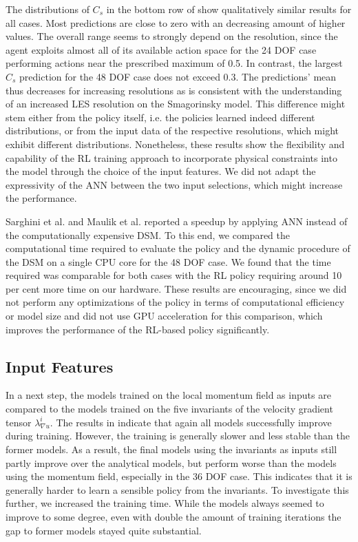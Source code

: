 The distributions of $C_s$ in the bottom row of  show qualitatively similar results for all cases.
Most predictions are close to zero with an decreasing amount of higher values.
The overall range seems to strongly depend on the resolution, since the agent exploits almost all of its available action space for the 24 DOF case performing actions near the prescribed maximum of 0.5.
In contrast, the largest $C_s$ prediction for the 48 DOF case does not exceed 0.3.
The predictions' mean thus decreases for increasing resolutions as is consistent with the understanding of an increased LES resolution on the Smagorinsky model.
This difference might stem either from the policy itself, i.e. the policies learned indeed different distributions, or from the input data of the respective resolutions, which might exhibit different distributions.
Nonetheless, these results show the flexibility and capability of the RL training approach to incorporate physical constraints into the model through the choice of the input features.
We did not adapt the expressivity of the ANN between the two input selections, which might increase the performance.

Sarghini et al. \cite{sarghini2003neural} and Maulik et al. \cite{maulik2021deploying} reported a speedup by applying ANN instead of the computationally expensive DSM.
To this end, we compared the computational time required to evaluate the policy and the dynamic procedure of the DSM on a single CPU core for the 48 DOF case.
We found that the time required was comparable for both cases with the RL policy requiring around 10 per cent more time on our hardware.
These results are encouraging, since we did not perform any optimizations of the policy in terms of computational efficiency or model size and did not use GPU acceleration for this comparison, which improves the performance of the RL-based policy significantly.

\subsection{Input Features}
\label{sec:results_features}

In a next step, the models trained on the local momentum field as inputs are compared to the models trained on the five invariants of the velocity gradient tensor $\lambda_{\nabla u}^i$.
The results in  indicate that again all models successfully improve during training.
However, the training is generally slower and less stable than the former models.
As a result, the final models using the invariants as inputs still partly improve over the analytical models, but perform worse than the models using the momentum field, especially in the 36 DOF case.
This indicates that it is generally harder to learn a sensible policy from the invariants.
To investigate this further, we increased the training time.
While the models always seemed to improve to some degree, even with double the amount of training iterations the gap to former models stayed quite substantial.


